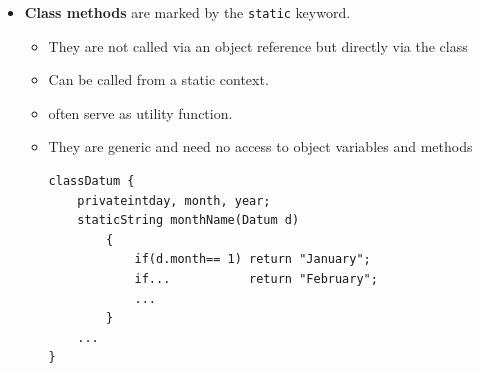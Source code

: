 \documentclass[a4paper]{article}
\newcommand{\inline}[1]{\lstinline!#1!}%
\begin{document}
\begin{itemize}
\begin{itemize}
	 		\item \textbf{Class methods} are marked by the \inline{static} keyword.
	 			\begin{itemize}
	 		\item They are not called via an object reference but directly via the class
	 		\item Can be called from a static context.
	 		\item often serve as utility function.
	 		\item They are generic and need no access to object variables and methods
	 			\begin{lstlisting}
classDatum {
	privateintday, month, year;
	staticString monthName(Datum d)
		{
			if(d.month== 1) return "January";
			if... 			return "February";
			...
		}
	...
}
	 			\end{lstlisting}
	 			\end{itemize}
	 	\end{itemize}
\end{itemize}
\end{document}
